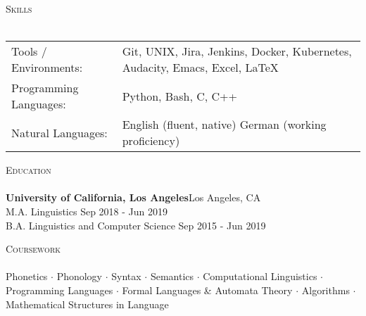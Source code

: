 \documentclass[]{article}
\newcommand{\lineunder} {
    \vspace*{-8pt} \\
    \hspace*{-18pt} \hrulefill \\
}
\newcommand{\header} [1] {
    {\hspace*{-18pt}\vspace*{6pt} \textsc{#1}}
    \vspace*{-6pt} \lineunder
}
\begin{document}
\header{Skills}
\begin{tabular}{ l p{11.2cm} }
	Tools / Environments:  & Git, UNIX, Jira, Jenkins, Docker, Kubernetes, Audacity, Emacs, Excel, \LaTeX
	\\
	Programming Languages: & Python, Bash, C, C++
	\\
	Natural Languages:     & English \hfill (fluent, native) \newline German \hfill (working proficiency)
	\\
\end{tabular}
\vspace{2mm}


\header{Education}
\textbf{University of California, Los Angeles}\hfill Los Angeles, CA\\
M.A. Linguistics \hfill Sep 2018 - Jun 2019\\
\vspace{1mm}
B.A. Linguistics and Computer Science \hfill Sep 2015 - Jun 2019\\
\vspace{1mm}
\vspace{1mm}

\header{Coursework}
Phonetics $\cdot$ Phonology $\cdot$ Syntax $\cdot$ Semantics $\cdot$ Computational Linguistics $\cdot$ Programming Languages $\cdot$ Formal Languages \& Automata Theory $\cdot$ Algorithms $\cdot$ Mathematical Structures in Language
\vspace*{10mm}
\end{document}
